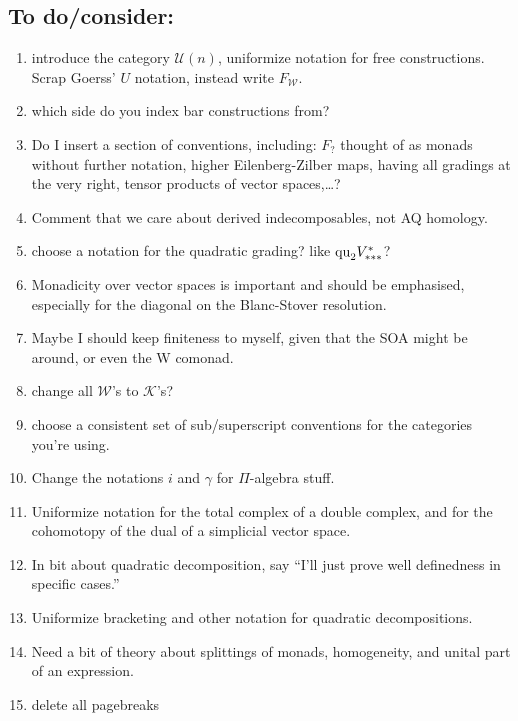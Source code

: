 \documentclass[11pt]{amsart}
\theoremstyle{plain}
\theoremstyle{definition}
\newcommand{\squishlist}{
  \setlength{\itemsep}{.5pt}
  \setlength{\parskip}{0pt}
  \setlength{\parsep}{0pt}}
\newcommand{\calW}{\mathcal{W}}
\newcommand{\calU}{\mathcal{U}}
\newcommand{\calK}{\mathcal{K}}
\theoremstyle{plain}
\begin{document}
\begin{todolist}
\section{To do/consider:}
\begin{enumerate}\squishlist
\setlength{\parindent}{.25in}
\item introduce the category $\calU(n)$, uniformize notation for free constructions. Scrap Goerss' $U$ notation, instead write $F_{\calW}$.
\item which side do you index bar constructions from?
\item Do I insert a section of conventions, including: %
$F_?$ thought of as monads without further notation, %
higher Eilenberg-Zilber maps, %
having all gradings at the very right, tensor products of vector spaces,\ldots?
\item Comment that we care about derived indecomposables, not AQ homology.
\item choose a notation for the quadratic grading? like $\textup{qu}_2V^{*}_{***}$?
\item Monadicity over vector spaces is important and should be emphasised, especially for the diagonal on the Blanc-Stover resolution.
\item Maybe I should keep finiteness to myself, given that the SOA might be around, or even the W comonad.
\item change all $\calW$'s to $\calK$'s?
\item choose a consistent set of sub/superscript conventions for the categories you're using.
\item Change the notations $i$ and $\gamma$ for $\Pi$-algebra stuff.
\item Uniformize notation for the total complex of a double complex, and for the cohomotopy of the dual of a simplicial vector space.
\item In bit about quadratic decomposition, say ``I'll just prove well definedness in specific cases.''
\item Uniformize bracketing and other notation for quadratic decompositions.
\item Need a bit of theory about splittings of monads, homogeneity, and unital part of an expression.
\item delete all pagebreaks

\end{enumerate}
\end{todolist}
\end{document}

